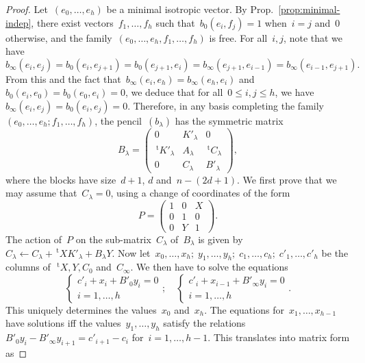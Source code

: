 \documentclass{lms}%
\def\transpose{\,{}^{\mathrm{t}\!}}
\def\mat#1{\begin{pmatrix}#1\end{pmatrix}}
\begin{document}
{\begin{proof}
Let~$(e_0, …, e_h)$ be a minimal isotropic vector. By
Prop.~\ref{prop:minimal-indep}, there exist vectors~$f_1,…,f_h$ such
that~$b_0(e_i, f_j) = 1$ when~$i = j$ and~$0$ otherwise, and the
family~$(e_0,…, e_h, f_1, …, f_h)$ is free.
For all~$i, j$, note that we have
\begin{equation}\label{eq:zero-bij}
b_{∞}(e_i,e_j) = b_0(e_i, e_{j+1}) = b_0(e_{j+1}, e_i) =
  b_{∞} (e_{j+1}, e_{i-1}) = b_{∞} (e_{i-1}, e_{j+1}).
\end{equation}
From this and the fact that~$b_{∞} (e_i, e_h) = b_{∞} (e_h, e_i)$
and~$b_0 (e_i, e_0) = b_0 (e_0, e_i) = 0$, we deduce that for all~$0 ≤
i,j ≤ h$, we have~$b_{∞} (e_i, e_j) = b_0 (e_i, e_j) = 0$. Therefore,
in any basis completing the family~$(e_0, …, e_h; f_1, …, f_h)$,
the pencil~$(b_{λ})$ has the symmetric matrix
\begin{equation}\label{eq:matrix-b1}
B_{λ} = \mat{0 & K'_{λ} & 0\\\transpose{K'_{λ}} & A_{λ}&\transpose{C_{λ}}\\
  0 & C_{λ} & B'_{λ}},
\end{equation}
where the blocks have size~$d+1$, $d$ and~$n-(2d+1)$.
We first prove that we may assume that~$C_{λ} = 0$, using a change of
coordinates of the form
\begin{equation}\label{eq:p1}
P = \mat{1 & 0 & X\\0&1&0\\0&Y&1}.
\end{equation}
The action of~$P$ on the sub-matrix~$C_{λ}$ of~$B_{λ}$ is given by $C_{λ}
← C_{λ} + \transpose{X} K'_{λ} + B_{λ} Y$. Now let~$x_0,…,x_{h};\;
y_1,…,y_h;\; c_1,…,c_h;\; c'_1,…,c'_h$ be the columns of~$\transpose{X}, Y,
C_0$ and~$C_{∞}$. We then have to
solve the equations
\begin{equation}\label{eq:chvar-x}
\begin{cases} c'_i + x_i + B'_0 y_i = 0\\ i = 1,…,h\end{cases};\quad
\begin{cases} c'_i + x_{i-1} + B'_∞ y_i = 0\\i=1,…,h\end{cases}.
\end{equation}
This uniquely determines the values~$x_0$ and~$x_{h}$. The equations
for~$x_1,…,x_{h-1}$ have solutions iff the values~$y_1,…,y_h$ satisfy
the relations
$B'_0 y_i - B'_{∞} y_{i+1} = c'_{i+1} - c_i$ for~$i = 1,…,h-1$. This
translates into matrix form as

\end{proof}}
\end{document}
